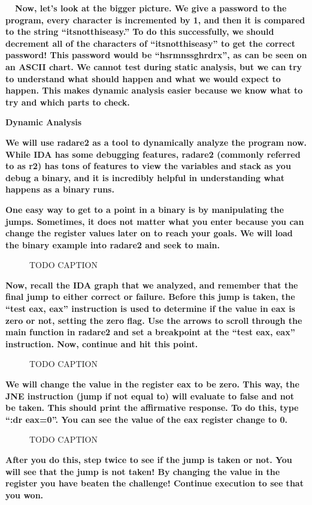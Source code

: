 \documentclass[letterpaper]{article}
\newcommand{\sitfig}[3]{
\begin{figure}[H]
\centering
\makebox[\textwidth][c]{
#2
}
\caption{#3}
\label{#1}
\end{figure}
}
\newcommand{\sitgfx}[4][scale=1.0]{
\sitfig{#3}{\texttt{[image: \#2]}}{#4}
}
\begin{document}
\textbf{ \ \ Now, let's look at the bigger picture. We give a password to the program, every character is incremented by
1, and then it is compared to the string ``itsnotthiseasy.'' To do this successfully, we should decrement all of the
characters of ``itsnotthiseasy'' to get the correct password! This password would be
``hsrmnssghrd{\textasciigrave}rx'', as can be seen on an ASCII chart. We cannot test during static analysis, but we can
try to understand what should happen and what we would expect to happen. This makes dynamic analysis easier because we
know what to try and which parts to check.}

{\centering
\textbf{Dynamic Analysis}
\par}

\textbf{We will use radare2 as a tool to dynamically analyze the program now. While IDA has some debugging features,
radare2 (commonly referred to as r2) has tons of features to view the variables and stack as you debug a binary, and it
is incredibly helpful in understanding what happens as a binary runs.}

\textbf{One easy way to get to a point in a binary is by manipulating the jumps. Sometimes, it does not matter what you
enter because you can change the register values later on to reach your goals. We will load the binary example into
radare2 and seek to main.}

  
\sitgfx[width=6.5in,height=4.0626in]{FINALWORKINGDOCFORMERLYPRECURSOR-img053.png}{fig:unk}{TODO CAPTION}
 \textbf{Now, recall the IDA graph that we analyzed, and remember that the final jump to either correct or failure.
Before this jump is taken, the ``test eax, eax'' instruction is used to determine if the value in eax is zero or not,
setting the zero flag. Use the arrows to scroll through the main function in radare2 and set a breakpoint at the ``test
eax, eax'' instruction. Now, continue and hit this point.}

  
\sitgfx[width=6.5in,height=4.0626in]{FINALWORKINGDOCFORMERLYPRECURSOR-img054.png}{fig:unk}{TODO CAPTION}
 \textbf{We will change the value in the register eax to be zero. This way, the JNE instruction (jump if not equal to)
will evaluate to false and not be taken. This should print the affirmative response. To do this, type ``:dr eax=0''.
You can see the value of the eax register change to 0. }  
\sitgfx[width=6.5in,height=4.0626in]{FINALWORKINGDOCFORMERLYPRECURSOR-img055.png}{fig:unk}{TODO CAPTION}
 

\textbf{After you do this, step twice to see if the jump is taken or not. You will see that the jump is not taken! By
changing the value in the register you have beaten the challenge! Continue execution to see that you won.}
\end{document}
